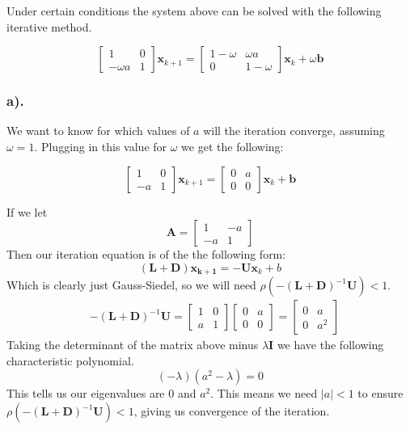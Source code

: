 \documentclass[11pt]{article}
\begin{document}
    Under certain conditions the system above can be solved with the
following iterative method.

\[
\begin{bmatrix}
    1 &0\\
    -\omega a &1
\end{bmatrix}
\mathbf{x}_{k+1}
=
\begin{bmatrix}
    1-\omega &\omega a\\
    0 &1-\omega
\end{bmatrix}
\mathbf{x}_k + \omega\mathbf{b}
\]

    \hypertarget{a.}{%
\subsubsection*{a).}\label{a.}}

We want to know for which values of \(a\) will the iteration converge,
assuming \(\omega=1\). Plugging in this value for \(\omega\) we get the following:

\[
\begin{bmatrix}
1 &0\\
-a &1
\end{bmatrix}
\mathbf{x}_{k+1}
=
\begin{bmatrix}
0 &a\\
0 &0
\end{bmatrix}
\mathbf{x}_k + \mathbf{b}
\]

If we let 
\[\mathbf{A}=\begin{bmatrix}1 &-a\\-a&1\end{bmatrix}\]
Then our iteration equation is of the the following form:
\[(\mathbf{L}+\mathbf{D})\mathbf{x_{k+1}}=-\mathbf{U}\mathbf{x}_k+b\]
Which is clearly just Gauss-Siedel, so we will need \(\rho(-(\mathbf{L}+\mathbf{D})^{-1}\mathbf{U})<1\).
\begin{align*}
	&-(\mathbf{L}+\mathbf{D})^{-1}\mathbf{U} = 
	\begin{bmatrix}
		1 &0\\
		a & 1
	\end{bmatrix}
	\begin{bmatrix}
		0 &a\\0 &0
	\end{bmatrix}
	=
	\begin{bmatrix}
		0 &a\\
		0 &a^2
	\end{bmatrix}
\end{align*}
Taking the determinant of the matrix above minus \(\lambda\mathbf{I}\) we have the following characteristic polynomial.
\[(-\lambda)(a^2-\lambda)=0\]
This tells us our eigenvalues are 0 and \(a^2\). This means we need \(\boxed{|a|<1}\) to ensure \(\rho(-(\mathbf{L}+\mathbf{D})^{-1}\mathbf{U})<1\), giving us convergence of the iteration.
\end{document}
